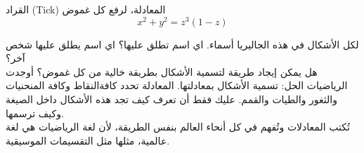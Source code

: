 \begin{surferPage}[القراد]{القراد (Tick)}
المعادلة، لرفع كل غموض \\
\smallskip
\[x^2 + y^2	= z^3	(1 - z) \]


\singlespacing
لكل الأشكال في هذه الجاليريا أسماء. اي اسم تطلق عليها؟ اي اسم يطلق عليها شخص آخر؟\\
\vspace{0.3cm}
هل يمكن إيجاد طريقة لتسمية الأشكال بطريقة خالية من كل غموض؟ أوجدت الرياضيات الحل: تسمية الأشكال بمعادلتها. المعادلة تحدد كافةالنقاط وكافة المنحنيات والثغور والطيات والقمم. عليك فقط أن تعرف كيف تجد هذه الأشكال داخل الصيغة وكيف ترسمها.\\
\vspace{0.3cm}
تُكتب المعادلات وتُفهم في كل أنحاء العالم بنفس الطريقة، لأن لغة الرياضيات هي لغة عالمية، مثلها مثل التقسيمات الموسيقية.
\end{surferPage}
